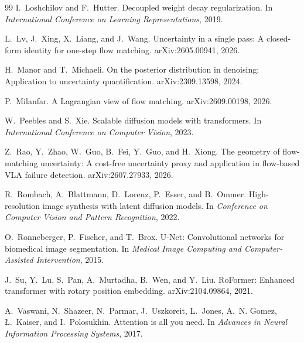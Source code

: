 \documentclass{article}
\theoremstyle{remark}
\begin{document}
\begin{thebibliography}{99}
I.~Loshchilov and F.~Hutter.
\newblock Decoupled weight decay regularization.
\newblock In \emph{International Conference on Learning Representations}, 2019.

L.~Lv, J.~Xing, X.~Liang, and J.~Wang.
\newblock Uncertainty in a single pass: A closed-form identity for one-step flow matching.
\newblock arXiv:2605.00941, 2026.

H.~Manor and T.~Michaeli.
\newblock On the posterior distribution in denoising: Application to uncertainty quantification.
\newblock arXiv:2309.13598, 2024.

P.~Milanfar.
\newblock A Lagrangian view of flow matching.
\newblock arXiv:2609.00198, 2026.

W.~Peebles and S.~Xie.
\newblock Scalable diffusion models with transformers.
\newblock In \emph{International Conference on Computer Vision}, 2023.

Z.~Rao, Y.~Zhao, W.~Guo, B.~Fei, Y.~Guo, and H.~Xiong.
\newblock The geometry of flow-matching uncertainty: A cost-free uncertainty proxy and application in flow-based VLA failure detection.
\newblock arXiv:2607.27933, 2026.

R.~Rombach, A.~Blattmann, D.~Lorenz, P.~Esser, and B.~Ommer.
\newblock High-resolution image synthesis with latent diffusion models.
\newblock In \emph{Conference on Computer Vision and Pattern Recognition}, 2022.

O.~Ronneberger, P.~Fischer, and T.~Brox.
\newblock U-Net: Convolutional networks for biomedical image segmentation.
\newblock In \emph{Medical Image Computing and Computer-Assisted Intervention}, 2015.

J.~Su, Y.~Lu, S.~Pan, A.~Murtadha, B.~Wen, and Y.~Liu.
\newblock RoFormer: Enhanced transformer with rotary position embedding.
\newblock arXiv:2104.09864, 2021.

A.~Vaswani, N.~Shazeer, N.~Parmar, J.~Uszkoreit, L.~Jones, A.~N. Gomez, {\L}.~Kaiser, and I.~Polosukhin.
\newblock Attention is all you need.
\newblock In \emph{Advances in Neural Information Processing Systems}, 2017.


\end{thebibliography}
\end{document}
